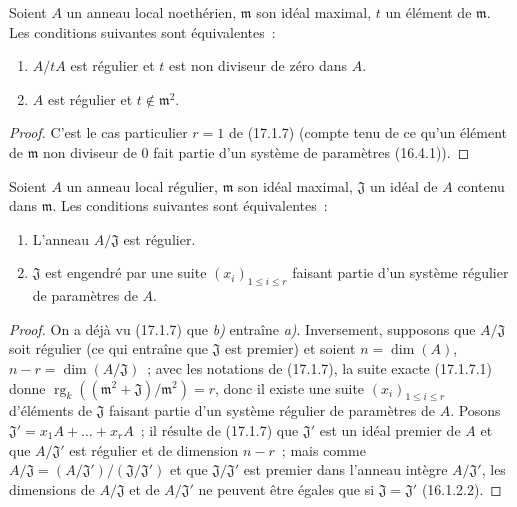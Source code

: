 
\begin{corollary}[17.1.8]
\label{0.17.1.8-fr}
Soient $A$ un anneau local noethérien, $\mathfrak{m}$ son idéal maximal, $t$ un
élément de $\mathfrak{m}$. Les conditions suivantes sont équivalentes~:
\begin{enumerate}
  \item[\rm a)] $A/tA$ est régulier et $t$ est non diviseur de zéro dans $A$.
  \item[\rm b)] $A$ est régulier et $t\notin\mathfrak{m}^2$.
\end{enumerate}
\end{corollary}

\begin{proof}
C'est le cas particulier $r=1$ de (17.1.7) (compte tenu de ce qu'un élément de
$\mathfrak{m}$ non diviseur de $0$ fait partie d'un système de paramètres
(16.4.1)).
\end{proof}

\begin{corollary}[17.1.9]
\label{0.17.1.9-fr}
Soient $A$ un anneau local régulier, $\mathfrak{m}$ son idéal maximal,
$\mathfrak{J}$ un idéal de $A$ contenu dans $\mathfrak{m}$. Les conditions
suivantes sont équivalentes~:
\begin{enumerate}
  \item[\rm a)] L'anneau $A/\mathfrak{J}$ est régulier.
  \item[\rm b)] $\mathfrak{J}$ est engendré par une suite
  $(x_i)_{1\leq i\leq r}$ faisant partie d'un système régulier de paramètres
  de $A$.
\end{enumerate}
\end{corollary}

\begin{proof}
On a déjà vu (17.1.7) que \emph{b)} entraîne \emph{a)}. Inversement, supposons que
$A/\mathfrak{J}$ soit régulier (ce qui entraîne que $\mathfrak{J}$ est premier)
et soient $n=\dim(A)$, $n-r=\dim(A/\mathfrak{J})$~; avec les notations de
(17.1.7), la suite exacte (17.1.7.1) donne
$\operatorname{rg}_k((\mathfrak{m}^2+\mathfrak{J})/\mathfrak{m}^2)=r$, donc il
existe une suite $(x_i)_{1\leq i\leq r}$ d'éléments de $\mathfrak{J}$ faisant
partie d'un système régulier de paramètres de $A$. Posons
$\mathfrak{J}'=x_1A+\ldots+x_rA$~; il résulte de (17.1.7) que $\mathfrak{J}'$
est un idéal premier de $A$ et que $A/\mathfrak{J}'$ est régulier et de
dimension $n-r$~; mais comme
$A/\mathfrak{J}=(A/\mathfrak{J}')/(\mathfrak{J}/\mathfrak{J}')$ et que
$\mathfrak{J}/\mathfrak{J}'$ est premier dans l'anneau intègre
$A/\mathfrak{J}'$, les dimensions de $A/\mathfrak{J}$ et de
$A/\mathfrak{J}'$ ne peuvent être égales que si
$\mathfrak{J}=\mathfrak{J}'$ (16.1.2.2).
\end{proof}

